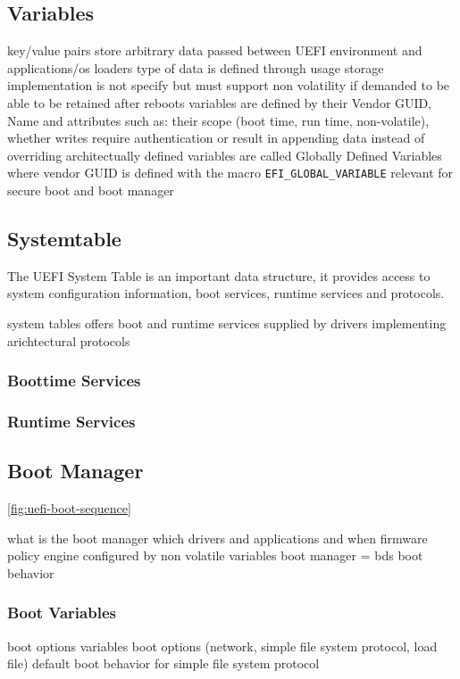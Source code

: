 \subsection{Variables}
key/value pairs
store arbitrary data passed between UEFI environment and applications/os loaders
type of data is defined through usage
storage implementation is not specify but must support non volatility if demanded to be able to be retained after reboots
variables are defined by their Vendor GUID, Name and attributes such as: their scope (boot time, run time, non-volatile), whether writes require authentication or result in appending data instead of overriding
\cite[8.2]{uefi-spec}
architectually defined variables are called Globally Defined Variables where vendor GUID is defined with the macro \lstinline{EFI_GLOBAL_VARIABLE}
\cite[3.3]{uefi-spec}
relevant for secure boot and boot manager

\subsection{Systemtable}
The UEFI System Table is an important data structure, it provides access to system configuration information, boot services, runtime services and protocols.

system tables offers boot and runtime services
supplied by drivers implementing arichtectural protocols %
\subsubsection{Boottime Services}
\subsubsection{Runtime Services}

\subsection{Boot Manager}

\autoref{fig:uefi-boot-sequence}

what is the boot manager
which drivers and applications and when
firmware policy engine
configured by non volatile variables
\cite[3.1.]{uefi-spec}
boot manager = bds
boot behavior
\subsubsection{Boot Variables}
\label{sec:uefi-pi:uefi:boot-manager:boot-variables}
boot options variables
boot options (network, simple file system protocol, load file)
default boot behavior for simple file system protocol

